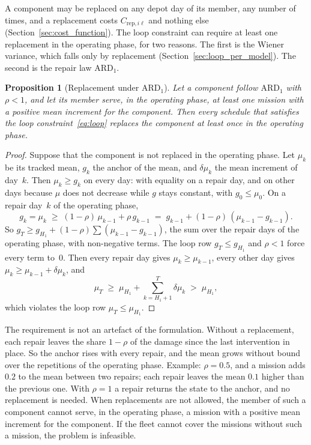 \documentclass[11pt,a4paper]{article}
\theoremstyle{plain}
\newtheorem{proposition}[theorem]{Proposition}
\theoremstyle{definition}
\theoremstyle{remark}
\begin{document}
A component may be replaced on any depot day of its member, any number of times, and a replacement costs $C_{\mathrm{rep},i\ell}$ and nothing else (Section~\ref{sec:cost_function}).
The loop constraint can require at least one replacement in the operating phase, for two reasons.
The first is the Wiener variance, which falls only by replacement (Section~\ref{sec:loop_per_model}).
The second is the repair law $\text{ARD}_1$.

\begin{proposition}[Replacement under $\text{ARD}_1$]\label{prop:ard1_replacement}
Let a component follow $\text{ARD}_1$ with $\rho < 1$, and let its member serve, in the operating phase, at least one mission with a positive mean increment for the component.
Then every schedule that satisfies the loop constraint~\eqref{eq:loop} replaces the component at least once in the operating phase.
\end{proposition}
\begin{proof}
Suppose that the component is not replaced in the operating phase.
Let $\mu_k$ be its tracked mean, $g_k$ the anchor of the mean, and $\delta\mu_k$ the mean increment of day~$k$.
Then $\mu_k \ge g_k$ on every day: with equality on a repair day, and on other days because $\mu$ does not decrease while $g$ stays constant, with $g_0 \le \mu_0$.
On a repair day~$k$ of the operating phase,
\[
  g_k = \mu_k \;\ge\; (1-\rho)\,\mu_{k-1} + \rho\, g_{k-1} \;=\; g_{k-1} + (1-\rho)\,(\mu_{k-1} - g_{k-1}).
\]
So $g_T \ge g_{H_1} + (1-\rho)\sum (\mu_{k-1} - g_{k-1})$, the sum over the repair days of the operating phase, with non-negative terms.
The loop row $g_T \le g_{H_1}$ and $\rho < 1$ force every term to~$0$.
Then every repair day gives $\mu_k \ge \mu_{k-1}$, every other day gives $\mu_k \ge \mu_{k-1} + \delta\mu_k$, and
\[
  \mu_T \;\ge\; \mu_{H_1} + \sum_{k=H_1+1}^{T} \delta\mu_k \;>\; \mu_{H_1},
\]
which violates the loop row $\mu_T \le \mu_{H_1}$.
\end{proof}

The requirement is not an artefact of the formulation.
Without a replacement, each repair leaves the share $1-\rho$ of the damage since the last intervention in place.
So the anchor rises with every repair, and the mean grows without bound over the repetitions of the operating phase.
Example: $\rho = 0.5$, and a mission adds $0.2$ to the mean between two repairs; each repair leaves the mean $0.1$ higher than the previous one.
With $\rho = 1$ a repair returns the state to the anchor, and no replacement is needed.
When replacements are not allowed, the member of such a component cannot serve, in the operating phase, a mission with a positive mean increment for the component.
If the fleet cannot cover the missions without such a mission, the problem is infeasible.
\end{document}
